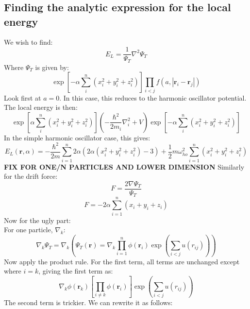 \documentclass[a4paper, 10pt]{article}
\begin{document}
\begin{appendices}
		\section{Finding the analytic expression for the local energy}
		We wish to find:
		\begin{equation}
		E_L=\frac{1}{\Psi_T}\nabla^2 \Psi_T
		\end{equation}
		Where $\Psi_T$ is given by:
		\begin{equation}
		\exp\left[ -\alpha \sum_{i}^n\left(x_i^2+y_i^2+z_i^2\right)\right]\prod_{i<j}f(a, |\mathbf{r}_i-\mathbf{r}_j|)
		\end{equation}
		Look first at $a=0$. In this case, this reduces to the harmonic oscillator potential. The local energy is then:
		\begin{equation}
		\exp\left[ \alpha \sum_{i}^n\left(x_i^2+y_i^2+z_i^2\right)\right]\left(-\frac{\hbar^2}{2m_i}\nabla_i^2+V\right)\exp\left[ -\alpha \sum_{i}^n\left(x_i^2+y_i^2+z_i^2\right)\right]
		\end{equation}
		In the simple harmonic oscillator case, this gives:
		\begin{equation}
		E_L(\mathbf{r},\alpha)=-\frac{\hbar^2}{2m}\sum_{i=1}^n 2\alpha \left(2\alpha(x_i^2+y_i^2+z_i^2)-3\right)+\frac{1}{2}m\omega_{ho}^2\sum_{i=1}^n(x_i^2+y_i^2+z_i^2)
		\end{equation}
		\textbf{FIX FOR ONE/N PARTICLES AND LOWER DIMENSION}
		Similarly for the drift force:
		\begin{equation}
		F=\frac{2\nabla \Psi_T}{\Psi_T}
		\end{equation}
		\begin{equation}
		F=-2\alpha\sum_{i=1}^n(x_i+y_i+z_i)
		\end{equation}
		Now for the ugly part:\\
		For one particle, $\nabla_k$:
		\begin{equation}
		\nabla_k\Psi_{T} = \nabla_k\left(\Psi_T(\mathbf{r})=\nabla_k \prod_{i=1}^n\phi(\mathbf{r}_i)\exp\left(\sum_{i<j} u(r_{ij})\right)\right)
		\end{equation}
		Now apply the product rule. For the first term, all terms are unchanged except where $i=k$, giving the first term as:
		\begin{equation}
		\nabla_k \phi(\mathbf{r}_k)\left[ \prod_{i\neq k} \phi(\mathbf{r}_i)\right]\exp\left(\sum_{i<j}u(r_{ij})\right)
		\end{equation}
		The second term is trickier. We can rewrite it as follows:
		\begin{align}

\end{align}
\end{appendices}
\end{document}

